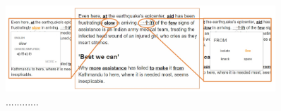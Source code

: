 \begin{figure}[ht]
\centering
    \includegraphics[width=0.9\textwidth]{chrome_extension.jpg}
	\caption{............}
	\label{fig:chrome_extension_1}
\end{figure}